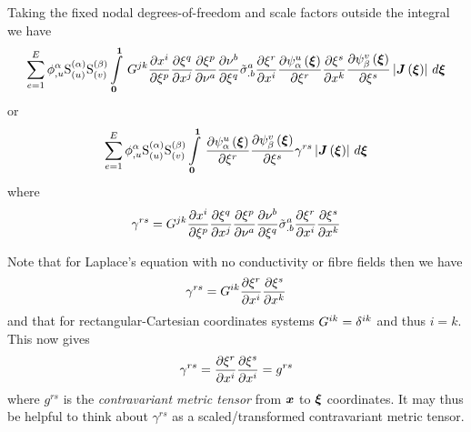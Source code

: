 Taking the fixed nodal degrees-of-freedom and scale factors outside the integral we have
\begin{equation}
  \dsum_{e=1}^{E}\nodedof{\phi}{\alpha}{u}\gsf{(\alpha)}{(u)}\gsf{(\beta)}{(v)}
  \gint{\vect{0}}{\vect{1}}{G^{jk}\delby{x^{i}}{\xi^{p}}
    \delby{\xi^{q}}{x^{j}}\delby{\xi^{p}} {\nu^{a}}
    \delby{\nu^{b}}{\xi^{q}}{\tilde{\sigma}}^{a}_{.b}\delby{\xi^{r}}{x^{i}}
    \delby{\gbfn{\alpha}{u}{\vect{\xi}}}{\xi^{r}}
    \delby{\xi^{s}}{x^{k}}\delby{\gbfn{\beta}{v}{\vect{\xi}}}{\xi^{s}}
    \abs{\fnof{\matr{J}}{\vect{\xi}}}}{\vect{\xi}}
  \label{eqn:elementalfemlhs1}
\end{equation}
or
\begin{equation}
  \dsum_{e=1}^{E}\nodedof{\phi}{\alpha}{u}\gsf{(\alpha)}{(u)}\gsf{(\beta)}{(v)}
  \gint{\vect{0}}{\vect{1}}{\delby{\gbfn{\alpha}{u}{\vect{\xi}}}{\xi^{r}}\delby{\gbfn{\beta}{v}{\vect{\xi}}}{\xi^{s}}\gamma^{rs}
    \abs{\fnof{\matr{J}}{\vect{\xi}}}}{\vect{\xi}}
  \label{eqn:elementalfemlhs2}
\end{equation}
where
\begin{equation}
  \gamma^{rs}=G^{jk} \dfrac{\partial x^{i}}{\partial \xi^{p}} 
     \dfrac{\partial \xi^{q}}{\partial x^{j}}  \dfrac{\partial \xi^{p}}{\partial \nu^{a}} 
     \dfrac{\partial \nu^{b}}{\partial \xi^{q}} {\tilde{\sigma}}^{a}_{.b} \dfrac{\partial \xi^{r}}{\partial x^{i}}  \dfrac{\partial \xi^{s}}{\partial x^{k}} 
\end{equation}

Note that for Laplace's equation with no conductivity or fibre fields then we have
\begin{equation}
  \gamma^{rs}=G^{ik} \dfrac{\partial \xi^{r}}{\partial x^{i}}  \dfrac{\partial \xi^{s}}{\partial x^{k}} 
\end{equation}
and that for rectangular-Cartesian coordinates systems
$G^{ik}=\delta^{{i}{k}}$ and thus $i=k$. This now gives
\begin{equation}
  \gamma^{rs}= \dfrac{\partial \xi^{r}}{\partial x^{i}}  \dfrac{\partial \xi^{s}}{\partial x^{i}} =g^{rs}
  \label{eqn:contrametrictensor}
\end{equation}
where $g^{rs}$ is the \emph{contravariant metric tensor} from $\vect{x}$ to
$\vect{\xi}$ coordinates. It may thus be helpful to think about $\gamma^{rs}$
as a scaled/transformed contravariant metric tensor.

